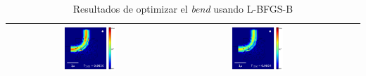 \begin{table}[H]
\begin{tabular}{|c|c|c|c|}
      \includegraphics[width=0.33\textwidth]{image/results/bend/L-BFGS-B/visualize_field_disc_512.png} &
      \includegraphics[width=0.33\textwidth]{image/results/bend/L-BFGS-B/visualize_field_fab_512.png} \\
    \hline
    \end{tabular}
    \hspace*{-3cm}
    \caption{Resultados de optimizar el \emph{bend} usando L-BFGS-B}
    \label{tab:opt-LBFGSB-bend}
\end{table}


